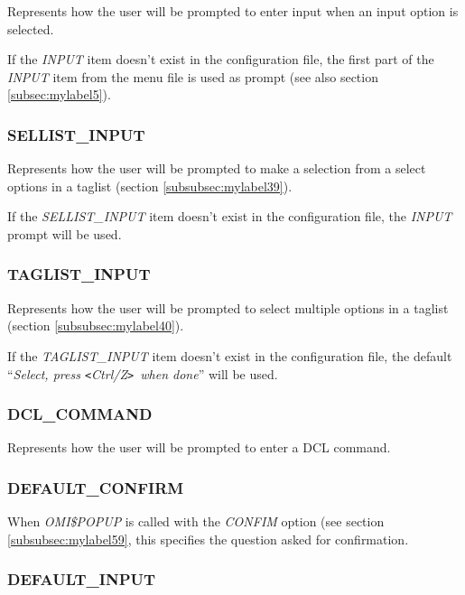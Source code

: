 \documentclass[a4paper]{book}
\newcommand{\lt}{\texttt{<}}
\newcommand{\gt}{\texttt{>}}
\begin{document}
Represents how the user will be prompted to enter input when an input option 
is selected.

If the \textsl{INPUT} item doesn't exist in the configuration file, the first part of the \textsl{INPUT}
item from the menu file is used as prompt (see also section \ref{subsec:mylabel5}).

\subsubsection{SELLIST{\_}INPUT}
\label{para:sellistinput}

Represents how the user will be prompted to make a selection from a select options in a taglist (section \ref{subsubsec:mylabel39}).

If the \textsl{SELLIST{\_}INPUT} item doesn't exist in the configuration file, the \textsl{INPUT} prompt will be used.

\subsubsection{TAGLIST{\_}INPUT}
\label{para:taglistinput}

Represents how the user will be prompted to select multiple options in a taglist (section \ref{subsubsec:mylabel40}).

If the \textsl{TAGLIST{\_}INPUT} item doesn't exist in the configuration file, the default ``\textsl{Select, press \lt Ctrl/Z\gt\ when done}'' will be used.


\subsubsection{DCL{\_}COMMAND}

Represents how the user will be prompted to enter a DCL command.

\subsubsection{DEFAULT{\_}CONFIRM}\label{para:defconfirm}

When \textsl{OMI{\$}POPUP} is called with the \textsl{CONFIM} option (see section \ref{subsubsec:mylabel59}, this specifies the question asked for confirmation.

\subsubsection{DEFAULT{\_}INPUT}
\end{document}
